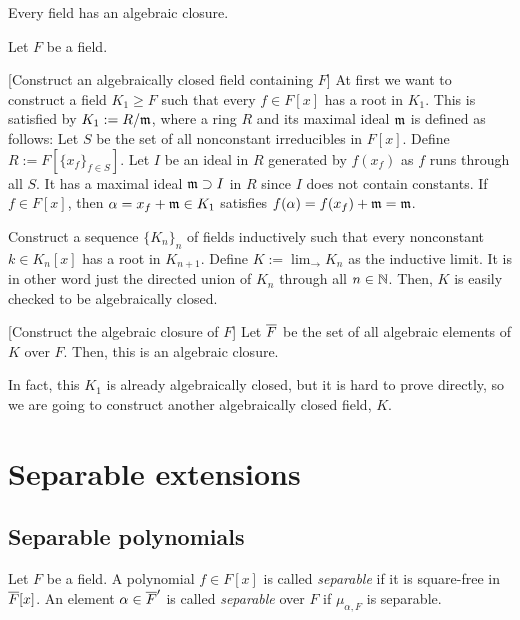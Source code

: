 \documentclass{../exp}
\begin{document}
\begin{thm}
Every field has an algebraic closure.
\end{thm}
\begin{pf}
Let $F$ be a field.

[Construct an algebraically closed field containing $F$]
At first we want to construct a field $K_1\ge F$ such that every $f\in F[x]$ has a root in $K_1$.
This is satisfied by $K_1:=R/\mathfrak{m}$, where a ring $R$ and its maximal ideal $\mathfrak{m}$ is defined as follows:
Let $S$ be the set of all nonconstant irreducibles in $F[x]$.
Define $R:=F[\{x_f\}_{f\in S}]$.
Let $I$ be an ideal in $R$ generated by $f(x_f)$ as $f$ runs through all $S$.
It has a maximal ideal $\mathfrak{m}\supset I$ in $R$ since $I$ does not contain constants.
If $f\in F[x]$, then $\alpha=x_f+\mathfrak{m}\in K_1$ satisfies $f(\alpha)=f(x_f)+\mathfrak{m}=\mathfrak{m}$.

Construct a sequence $\{K_n\}_n$ of fields inductively such that every nonconstant $k\in K_n[x]$ has a root in $K_{n+1}$.
Define $K:=\lim_{\to}K_n$ as the inductive limit.
It is in other word just the directed union of $K_n$ through all $n\in\mathbb{N}$.
Then, $K$ is easily checked to be algebraically closed.

[Construct the algebraic closure of $F$]
Let $\overline F$ be the set of all algebraic elements of $K$ over $F$.
Then, this is an algebraic closure.
\end{pf}
\begin{rmk}
In fact, this $K_1$ is already algebraically closed, but it is hard to prove directly, so we are going to construct another algebraically closed field, $K$.
\end{rmk}












\section{Separable extensions}

\subsection{Separable polynomials}
\begin{defn}
Let $F$ be a field.
A polynomial $f\in F[x]$ is called \emph{separable} if it is square-free in $\overline F[x]$.
An element $\alpha\in\overline F'$ is called \emph{separable} over $F$ if $\mu_{\alpha,F}$ is separable.
\end{defn}
\end{document}
